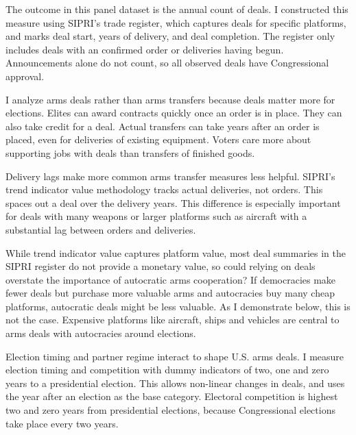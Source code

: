 \documentclass[12pt]{article}
\begin{document}
The outcome in this panel dataset is the annual count of deals.
I constructed this measure using SIPRI's trade register, which captures deals for specific platforms, and marks deal start, years of delivery, and deal completion.
The register only includes deals with an confirmed order or deliveries having begun. 
Announcements alone do not count, so all observed deals have Congressional approval.


I analyze arms deals rather than arms transfers because deals matter more for elections. 
Elites can award contracts quickly once an order is in place.
They can also take credit for a deal. 
Actual transfers can take years after an order is placed, even for deliveries of existing equipment. 
Voters care more about supporting jobs with deals than transfers of finished goods. 


Delivery lags make more common arms transfer measures less helpful.
SIPRI's trend indicator value methodology tracks actual deliveries, not orders.
This spaces out a deal over the delivery years. 
This difference is especially important for deals with many weapons or larger platforms such as aircraft with a substantial lag between orders and deliveries. 


While trend indicator value captures platform value, most deal summaries in the SIPRI register do not provide a monetary value, so could relying on deals overstate the importance of autocratic arms cooperation? 
If democracies make fewer deals but purchase more valuable arms and autocracies buy many cheap platforms, autocratic deals might be less valuable. 
As I demonstrate below, this is not the case. 
Expensive platforms like aircraft, ships and vehicles are central to arms deals with autocracies around elections. 


Election timing and partner regime interact to shape U.S. arms deals. 
I measure election timing and competition with dummy indicators of two, one and zero years to a presidential election. 
This allows non-linear changes in deals, and uses the year after an election as the base category. 
Electoral competition is highest two and zero years from presidential elections, because Congressional elections take place every two years. 
\end{document}
